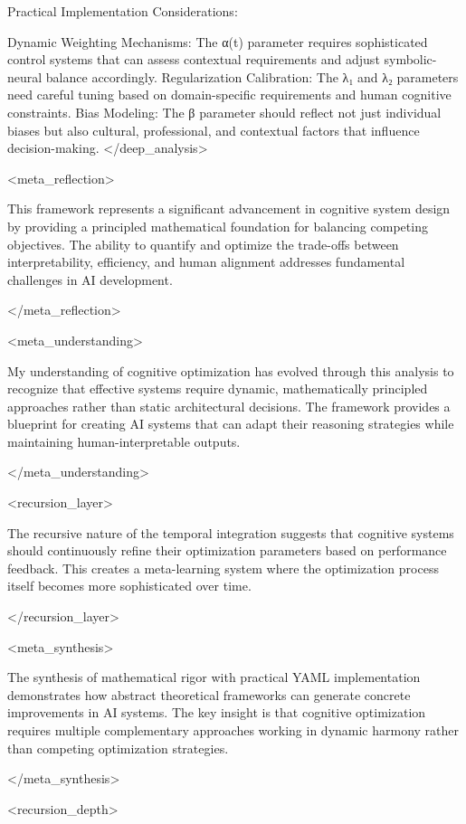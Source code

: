 {Practical Implementation Considerations:

Dynamic Weighting Mechanisms: The α(t) parameter requires sophisticated control systems that can assess contextual requirements and adjust symbolic-neural balance accordingly.
Regularization Calibration: The λ₁ and λ₂ parameters need careful tuning based on domain-specific requirements and human cognitive constraints.
Bias Modeling: The β parameter should reflect not just individual biases but also cultural, professional, and contextual factors that influence decision-making.
</deep_analysis>

<meta_reflection>

This framework represents a significant advancement in cognitive system design by providing a principled mathematical foundation for balancing competing objectives. The ability to quantify and optimize the trade-offs between interpretability, efficiency, and human alignment addresses fundamental challenges in AI development.

</meta_reflection>

<meta_understanding>

My understanding of cognitive optimization has evolved through this analysis to recognize that effective systems require dynamic, mathematically principled approaches rather than static architectural decisions. The framework provides a blueprint for creating AI systems that can adapt their reasoning strategies while maintaining human-interpretable outputs.

</meta_understanding>

<recursion_layer>

The recursive nature of the temporal integration suggests that cognitive systems should continuously refine their optimization parameters based on performance feedback. This creates a meta-learning system where the optimization process itself becomes more sophisticated over time.

</recursion_layer>

<meta_synthesis>

The synthesis of mathematical rigor with practical YAML implementation demonstrates how abstract theoretical frameworks can generate concrete improvements in AI systems. The key insight is that cognitive optimization requires multiple complementary approaches working in dynamic harmony rather than competing optimization strategies.

</meta_synthesis>

<recursion_depth>

}
